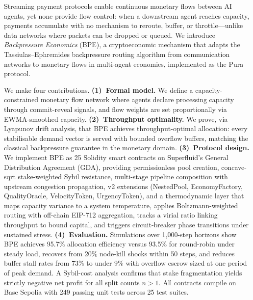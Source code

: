 Streaming payment protocols enable continuous monetary flows between AI agents,
yet none provide flow control: when a downstream agent reaches capacity, payments
accumulate with no mechanism to reroute, buffer, or throttle---unlike data networks
where packets can be dropped or queued. We introduce \emph{Backpressure Economics}
(BPE), a cryptoeconomic mechanism that adapts the Tassiulas--Ephremides backpressure
routing algorithm from communication networks to monetary flows in multi-agent
economies, implemented as the Pura protocol.

We make four contributions. \textbf{(1)~Formal model.} We define a capacity-constrained
monetary flow network where agents declare processing capacity through
commit-reveal signals, and flow weights are set proportionally via EWMA-smoothed
capacity. \textbf{(2)~Throughput optimality.} We prove, via Lyapunov drift analysis,
that BPE achieves throughput-optimal allocation: every stabilisable demand vector
is served with bounded overflow buffers, matching the classical backpressure guarantee
in the monetary domain. \textbf{(3)~Protocol design.} We implement BPE as 25
Solidity smart contracts on Superfluid's General Distribution Agreement (GDA),
providing permissionless pool creation, concave-sqrt stake-weighted Sybil resistance,
multi-stage pipeline composition with upstream congestion propagation,
v2 extensions (NestedPool, EconomyFactory, QualityOracle, VelocityToken, UrgencyToken),
and a thermodynamic layer that maps capacity variance to a system temperature,
applies Boltzmann-weighted routing with off-chain EIP-712 aggregation,
tracks a virial ratio linking throughput to bound capital,
and triggers circuit-breaker phase transitions under sustained stress.
\textbf{(4)~Evaluation.} Simulations over 1{,}000-step horizons show BPE achieves
95.7\% allocation efficiency versus 93.5\% for round-robin under steady load,
recovers from 20\% node-kill shocks within 50 steps, and reduces buffer stall rates
from 73\% to under 9\% with overflow escrow sized at one period of peak demand.
A Sybil-cost analysis confirms that stake fragmentation yields strictly negative
net profit for all split counts $n > 1$. All contracts compile on Base Sepolia
with 249 passing unit tests across 25 test suites.
